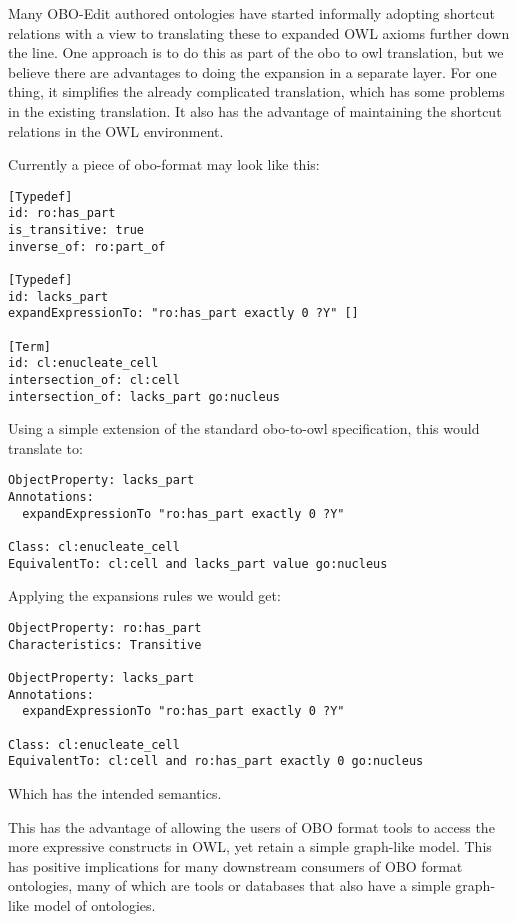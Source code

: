 \documentclass{llncs}
\begin{document}
Many OBO-Edit authored ontologies have started informally adopting
shortcut relations with a view to translating these to expanded OWL
axioms further down the line. One approach is to do this as part of
the obo to owl translation, but we believe there are advantages to
doing the expansion in a separate layer. For one thing, it simplifies
the already complicated translation, which has some problems in the
existing translation. It also has the advantage of maintaining the
shortcut relations in the OWL environment.

Currently a piece of obo-format may look like this:

\begin{verbatim}
[Typedef]
id: ro:has_part
is_transitive: true
inverse_of: ro:part_of

[Typedef]
id: lacks_part
expandExpressionTo: "ro:has_part exactly 0 ?Y" []

[Term]
id: cl:enucleate_cell
intersection_of: cl:cell
intersection_of: lacks_part go:nucleus
\end{verbatim}

Using a simple extension of the standard obo-to-owl specification, this
would translate to:

\begin{verbatim}
ObjectProperty: lacks_part
Annotations:
  expandExpressionTo "ro:has_part exactly 0 ?Y"

Class: cl:enucleate_cell
EquivalentTo: cl:cell and lacks_part value go:nucleus
\end{verbatim}

Applying the expansions rules we would get:

\begin{verbatim}
ObjectProperty: ro:has_part
Characteristics: Transitive

ObjectProperty: lacks_part
Annotations:
  expandExpressionTo "ro:has_part exactly 0 ?Y"

Class: cl:enucleate_cell
EquivalentTo: cl:cell and ro:has_part exactly 0 go:nucleus
\end{verbatim}

Which has the intended semantics.

This has the advantage of allowing the users of OBO format tools to
access the more expressive constructs in OWL, yet retain a simple
graph-like model. This has positive implications for many downstream
consumers of OBO format ontologies, many of which are tools or
databases that also have a simple graph-like model of ontologies.
\end{document}
